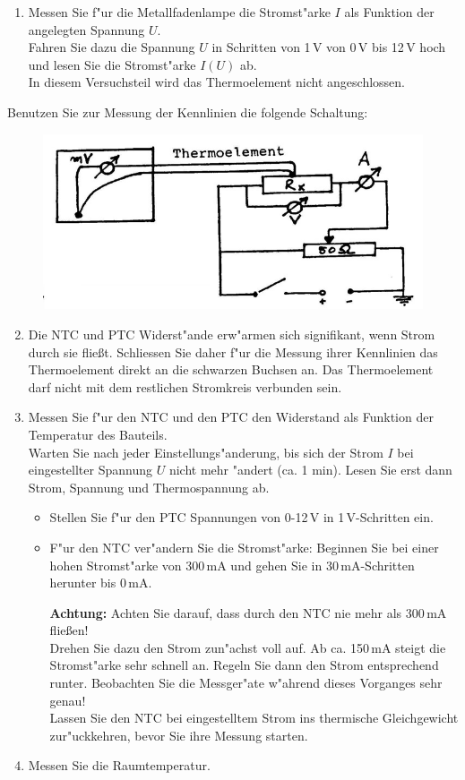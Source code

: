 \begin{enumerate}
 \item Messen Sie f"ur die Metallfadenlampe die Stromst"arke $I$ als Funktion der angelegten Spannung $U$.\\
  Fahren Sie dazu die Spannung $U$ in Schritten von 1\,V von 0\,V bis 12\,V hoch und lesen Sie die Stromst"arke $I(U)$ ab.\\
  In diesem Versuchsteil wird das Thermoelement nicht angeschlossen.
\end{enumerate}
Benutzen Sie zur Messung der Kennlinien die folgende Schaltung:
\begin{figure}[h]
	\centering
		\includegraphics[width=.5\textwidth]{Versuch_11-12/Abbildungen/Schaltplan-12.jpg}
	\label{fig:Schaltplan-12}
\end{figure}

\begin{enumerate} \setcounter{enumi}{1}
 \item Die NTC und PTC Widerst"ande erw"armen sich signifikant, wenn Strom durch sie flie{\ss}t. Schliessen Sie daher f"ur die Messung ihrer Kennlinien das Thermoelement direkt an die schwarzen Buchsen an. Das Thermoelement darf nicht mit dem restlichen Stromkreis verbunden sein.
 \item Messen Sie f"ur den NTC und den PTC den Widerstand als Funktion der Temperatur des Bauteils.\\
  Warten Sie nach jeder Einstellungs"anderung, bis sich der Strom $I$ bei eingestellter Spannung $U$ nicht mehr "andert (ca. 1 min). Lesen Sie erst dann Strom, Spannung und Thermospannung ab.
  \begin{itemize}
   \item Stellen Sie f"ur den PTC Spannungen von 0-12\,V in 1\,V-Schritten ein.
   \item F"ur den NTC ver"andern Sie die Stromst"arke: Beginnen Sie bei einer hohen Stromst"arke von 300\,mA und gehen Sie in 30\,mA-Schritten herunter bis 0\,mA.
   
    \noindent
    \textbf{Achtung:} Achten Sie darauf, dass durch den NTC nie mehr als 300\,mA flie{\ss}en!\\
    Drehen Sie dazu den Strom zun"achst voll auf. Ab ca. 150\,mA steigt die Stromst"arke sehr schnell an. Regeln Sie dann den Strom entsprechend runter. Beobachten Sie die Messger"ate w"ahrend dieses Vorganges sehr genau!\\
    Lassen Sie den NTC bei eingestelltem Strom ins thermische Gleichgewicht zur"uckkehren, bevor Sie ihre Messung starten.
  \end{itemize}
 \item Messen Sie die Raumtemperatur.
\end{enumerate}

